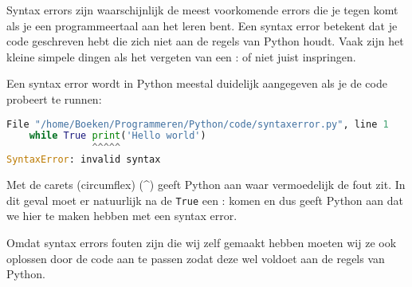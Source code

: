 Syntax errors zijn waarschijnlijk de meest voorkomende errors die je tegen komt als je een programmeertaal aan het leren bent. Een syntax error betekent dat je code geschreven hebt die zich niet aan de regels van Python houdt. Vaak zijn het kleine simpele dingen als het vergeten van een : of niet juist inspringen.

Een syntax error wordt in Python meestal duidelijk aangegeven als je de code probeert te runnen:
\begin{lstlisting}[language=python]
  File "/home/Boeken/Programmeren/Python/code/syntaxerror.py", line 1
    while True print('Hello world')
               ^^^^^
SyntaxError: invalid syntax
\end{lstlisting}
Met de carets (circumflex) (\textasciicircum) geeft Python aan waar vermoedelijk de fout zit. In dit geval moet er natuurlijk na de \texttt{True} een : komen en dus geeft Python aan dat we hier te maken hebben met een syntax error.

Omdat syntax errors fouten zijn die wij zelf gemaakt hebben moeten wij ze ook oplossen door de code aan te passen zodat deze wel voldoet aan de regels van Python.

